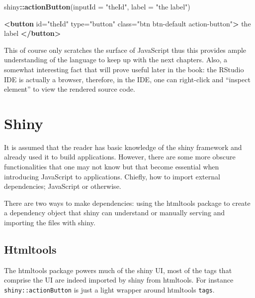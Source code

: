 \documentclass[
]{krantz}
\makeatletter
\newenvironment{Shaded}{\begin{snugshade}}{\end{snugshade}}
\newcommand{\DataTypeTok}[1]{\textcolor[rgb]{0.27,0.27,0.27}{#1}}
\newcommand{\KeywordTok}[1]{\textcolor[rgb]{0.27,0.27,0.27}{\textbf{#1}}}
\newcommand{\NormalTok}[1]{#1}
\newcommand{\OperatorTok}[1]{\textcolor[rgb]{0.43,0.43,0.43}{\textbf{#1}}}
\newcommand{\OtherTok}[1]{\textcolor[rgb]{0.37,0.37,0.37}{#1}}
\newcommand{\StringTok}[1]{\textcolor[rgb]{0.5,0.5,0.5}{#1}}
\newenvironment{kframe}{%
\medskip{}
\setlength{\fboxsep}{.8em}
 \def\at@end@of@kframe{}%
 \ifinner\ifhmode%
  \def\at@end@of@kframe{\end{minipage}}%
  \begin{minipage}{\columnwidth}%
 \fi\fi%
 \def\FrameCommand##1{\hskip\@totalleftmargin \hskip-\fboxsep
 \colorbox{shadecolor}{##1}\hskip-\fboxsep
     \hskip-\linewidth \hskip-\@totalleftmargin \hskip\columnwidth}%
 \MakeFramed {\advance\hsize-\width
   \@totalleftmargin\z@ \linewidth\hsize
   \@setminipage}}%
 {\par\unskip\endMakeFramed%
 \at@end@of@kframe}
\renewenvironment{Shaded}{\begin{kframe}}{\end{kframe}}
\makeatother
\begin{document}
\begin{Shaded}
\begin{Highlighting}[]
\NormalTok{shiny}\OperatorTok{::}\KeywordTok{actionButton}\NormalTok{(}\DataTypeTok{inputId =} \StringTok{"theId"}\NormalTok{, }\DataTypeTok{label =} \StringTok{"the label"}\NormalTok{) }
\end{Highlighting}
\end{Shaded}

\begin{Shaded}
\begin{Highlighting}[]
\KeywordTok{\textless{}button} 
\OtherTok{  id=}\StringTok{"theId"} 
\OtherTok{  type=}\StringTok{"button"} 
\OtherTok{  class=}\StringTok{"btn btn{-}default action{-}button"}\KeywordTok{\textgreater{}}
\NormalTok{  the label}
\KeywordTok{\textless{}/button\textgreater{}}
\end{Highlighting}
\end{Shaded}

This of course only scratches the surface of JavaScript thus this provides ample understanding of the language to keep up with the next chapters. Also, a somewhat interesting fact that will prove useful later in the book: the RStudio IDE is actually a browser, therefore, in the IDE, one can right-click and ``inspect element'' to view the rendered source code.

\hypertarget{basics-shiny}{%
\section{Shiny}\label{basics-shiny}}

It is assumed that the reader has basic knowledge of the shiny framework and already used it to build applications. However, there are some more obscure functionalities that one may not know but that become essential when introducing JavaScript to applications. Chiefly, how to import external dependencies; JavaScript or otherwise.

There are two ways to make dependencies: using the htmltools \citep{R-htmltools} package to create a dependency object that shiny can understand or manually serving and importing the files with shiny.

\hypertarget{basics-htmltools}{%
\subsection{Htmltools}\label{basics-htmltools}}

The htmltools package powers much of the shiny UI, most of the tags that comprise the UI are indeed imported by shiny from htmltools. For instance \texttt{shiny::actionButton} is just a light wrapper around htmltools \texttt{tags}.
\end{document}
